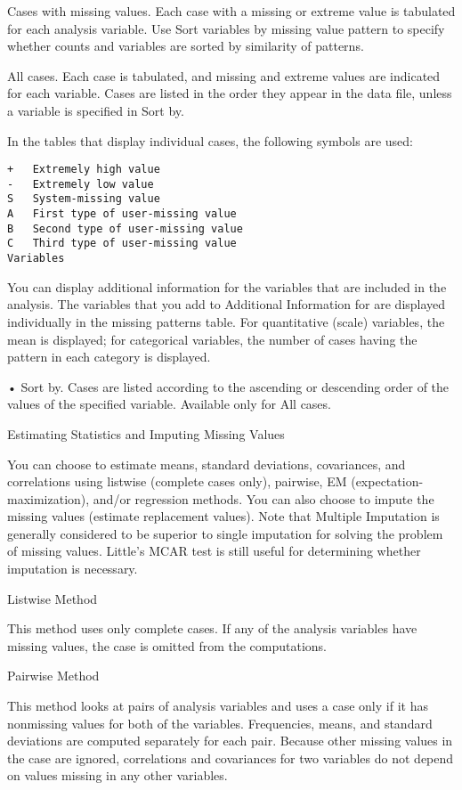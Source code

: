 \documentclass[12pt]{article}
\begin{document}
Cases with missing values. Each case with a missing or extreme value is tabulated for each analysis variable. Use Sort variables by missing value pattern to specify whether counts and variables are sorted by similarity of patterns.

All cases. Each case is tabulated, and missing and extreme values are indicated for each variable. Cases are listed in the order they appear in the data file, unless a variable is specified in Sort by.

In the tables that display individual cases, the following symbols are used:
\begin{verbatim}
+	Extremely high value
-	Extremely low value
S	System-missing value
A	First type of user-missing value
B	Second type of user-missing value
C	Third type of user-missing value
Variables
\end{verbatim}

You can display additional information for the variables that are included in the analysis. The variables that you add to Additional Information for are displayed individually in the missing patterns table. For quantitative (scale) variables, the mean is displayed; for categorical variables, the number of cases having the pattern in each category is displayed.

• Sort by. Cases are listed according to the ascending or descending order of the values of the specified variable. Available only for All cases.

Estimating Statistics and Imputing Missing Values

You can choose to estimate means, standard deviations, covariances, and correlations using listwise (complete cases only), pairwise, EM (expectation-maximization), and/or regression methods. You can also choose to impute the missing values (estimate replacement values). Note that Multiple Imputation is generally considered to be superior to single imputation for solving the problem of missing values. Little's MCAR test is still useful for determining whether imputation is necessary.

Listwise Method

This method uses only complete cases. If any of the analysis variables have missing values, the case is omitted from the computations.

Pairwise Method

This method looks at pairs of analysis variables and uses a case only if it has nonmissing values for both of the variables. Frequencies, means, and standard deviations are computed separately for each pair. Because other missing values in the case are ignored, correlations and covariances for two variables do not depend on values missing in any other variables.
\end{document}
